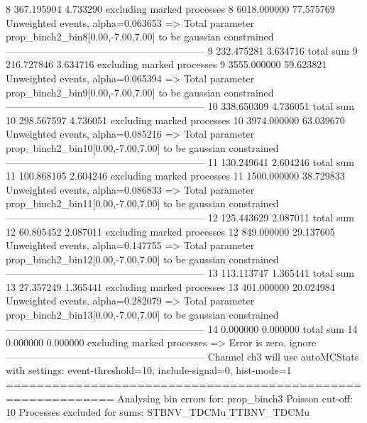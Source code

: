 8          367.195904      4.733290        excluding marked processes    
8          6018.000000     77.575769       Unweighted events, alpha=0.063653
  => Total parameter prop_binch2_bin8[0.00,-7.00,7.00] to be gaussian constrained
------------------------------------------------------------
9          232.475281      3.634716        total sum                     
9          216.727846      3.634716        excluding marked processes    
9          3555.000000     59.623821       Unweighted events, alpha=0.065394
  => Total parameter prop_binch2_bin9[0.00,-7.00,7.00] to be gaussian constrained
------------------------------------------------------------
10         338.650309      4.736051        total sum                     
10         298.567597      4.736051        excluding marked processes    
10         3974.000000     63.039670       Unweighted events, alpha=0.085216
  => Total parameter prop_binch2_bin10[0.00,-7.00,7.00] to be gaussian constrained
------------------------------------------------------------
11         130.249641      2.604246        total sum                     
11         100.868105      2.604246        excluding marked processes    
11         1500.000000     38.729833       Unweighted events, alpha=0.086833
  => Total parameter prop_binch2_bin11[0.00,-7.00,7.00] to be gaussian constrained
------------------------------------------------------------
12         125.443629      2.087011        total sum                     
12         60.805452       2.087011        excluding marked processes    
12         849.000000      29.137605       Unweighted events, alpha=0.147755
  => Total parameter prop_binch2_bin12[0.00,-7.00,7.00] to be gaussian constrained
------------------------------------------------------------
13         113.113747      1.365441        total sum                     
13         27.357249       1.365441        excluding marked processes    
13         401.000000      20.024984       Unweighted events, alpha=0.282079
  => Total parameter prop_binch2_bin13[0.00,-7.00,7.00] to be gaussian constrained
------------------------------------------------------------
14         0.000000        0.000000        total sum                     
14         0.000000        0.000000        excluding marked processes    
  => Error is zero, ignore      
------------------------------------------------------------
Channel ch3 will use autoMCStats with settings: event-threshold=10, include-signal=0, hist-mode=1
============================================================
Analysing bin errors for: prop_binch3
Poisson cut-off: 10
Processes excluded for sums: STBNV_TDCMu TTBNV_TDCMu
